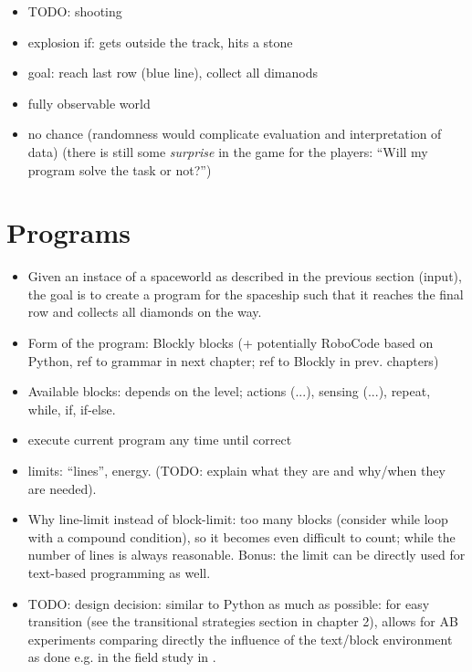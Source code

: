 \begin{itemize}
\item TODO: shooting
\item explosion if: gets outside the track, hits a stone
\item goal: reach last row (blue line), collect all dimanods
\item fully observable world
\item no chance (randomness would complicate evaluation and interpretation
  of data) (there is still some \emph{surprise} in the game for the players:
  ``Will my program solve the task or not?'')
\end{itemize}





\section{Programs}
\label{sec:robomission.programs}

\begin{itemize}
\item Given an instace of a spaceworld as described in the previous section
(input), the goal is to create a program for the spaceship such that it reaches
the final row and collects all diamonds on the way.
\item Form of the program: Blockly blocks (+ potentially RoboCode based on
Python, ref to grammar in next chapter; ref to Blockly in prev. chapters)
\item Available blocks: depends on the level;
  actions (...), sensing (...), repeat, while, if, if-else.
\item execute current program any time until correct
\item limits: ``lines'', energy.
  (TODO: explain what they are and why/when they are needed).
\item Why line-limit instead of block-limit: too many blocks (consider while
  loop with a compound condition), so it becomes even difficult to count;
  while the number of lines is always reasonable.
  Bonus: the limit can be directly used for text-based programming as well.
\item TODO: design decision: similar to Python as much as possible: for easy transition
(see the transitional strategies section in chapter 2), allows for AB experiments
comparing directly the influence of the text/block environment as done e.g.
in the field study in \cite{comparing-blocks-text-weintrop2017}.
\end{itemize}

